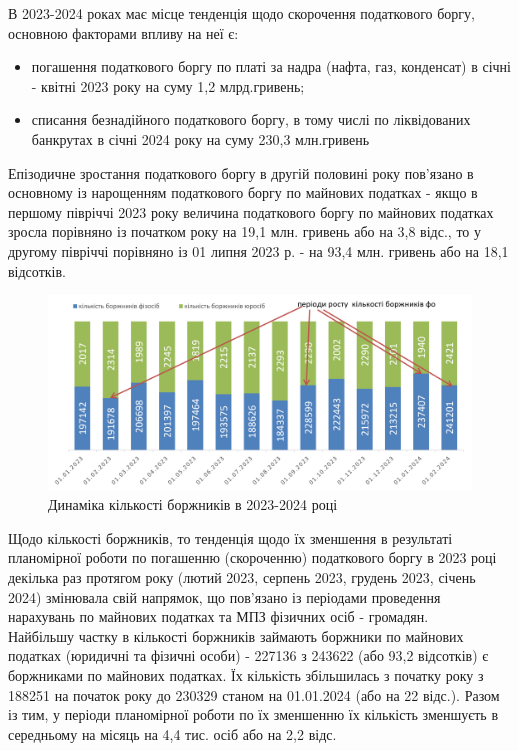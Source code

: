 \documentclass[a4paper,14pt]{article}
\begin{document}
В 2023-2024 роках має місце тенденція щодо скорочення податкового боргу, основною факторами впливу на неї є:
\begin{itemize}
	\item погашення податкового боргу по платі за надра (нафта, газ, конденсат) в січні - квітні 2023 року на суму 1,2 млрд.гривень;
	\item списання безнадійного податкового боргу, в тому числі по ліквідованих банкрутах в січні 2024 року на суму 230,3 млн.гривень
\end{itemize}

Епізодичне зростання податкового боргу в другій половині року пов'язано в основному із нарощенням податкового боргу по майнових податках - якщо в першому півріччі 2023 року величина податкового боргу по майнових податках зросла порівняно із початком року на 19,1 млн. гривень або на 3,8 відс., то у другому півріччі порівняно із 01 липня  2023 р. - на 93,4 млн. гривень або на 18,1 відсотків.

\begin{figure}[h]
	\centering
	\includegraphics[width=1\linewidth]{"Динаміка кількості боржників помісячно"}
	\caption{Динаміка кількості боржників в 2023-2024 році}
	\label{fig:-2}
\end{figure}

Щодо кількості боржників, то тенденція щодо їх зменшення в результаті планомірної роботи по погашенню (скороченню) податкового боргу в 2023 році декілька раз протягом року (лютий 2023, серпень 2023, грудень 2023, січень 2024) змінювала свій напрямок, що пов'язано із періодами проведення нарахувань по майнових податках та МПЗ фізичних осіб - громадян.\\

Найбільшу частку в кількості боржників займають боржники по майнових податках (юридичні та фізичні особи) - 227136 з 243622 (або 93,2 відсотків) є боржниками по майнових податках. Їх кількість збільшилась з початку року з 188251 на початок року до 230329 станом на 01.01.2024 (або на 22 відс.). Разом із тим, у періоди планомірної роботи по їх зменшенню їх кількість зменшуєть в середньому на місяць на 4,4 тис. осіб або на 2,2 відс.\\
\end{document}
